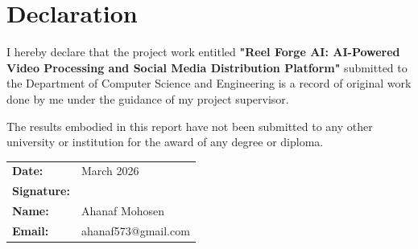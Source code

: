 \chapter*{Declaration}

\vspace{1cm}

I hereby declare that the project work entitled \textbf{"Reel Forge AI: AI-Powered Video Processing and Social Media Distribution Platform"} submitted to the Department of Computer Science and Engineering is a record of original work done by me under the guidance of my project supervisor.

\vspace{1cm}

The results embodied in this report have not been submitted to any other university or institution for the award of any degree or diploma.

\vspace{3cm}

\noindent
\begin{tabular}{@{}ll}
\textbf{Date:} & March 2026 \\[2cm]
\textbf{Signature:} & \hrulefill \\[0.5cm]
\textbf{Name:} & Ahanaf Mohosen \\[0.5cm]
\textbf{Email:} & ahanaf573@gmail.com \\
\end{tabular}
